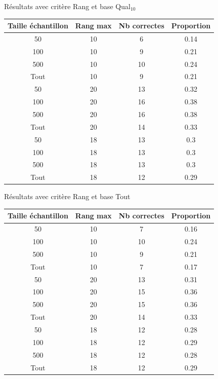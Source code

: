 \documentclass{beamer}
\begin{document}
\begin{frame}{Résultats avec critère Rang et base Qual$_{10}$}

\begin{tabular}{|c|c|c|c|}
   \hline
   Taille échantillon & Rang max & Nb correctes & Proportion\\
   \hline
   50 & 10  & 6 & 0.14  \\
   \hline
   100 & 10  & 9 & 0.21  \\
   \hline
   500 & 10  & 10 & 0.24  \\
   \hline
   Tout & 10 & 9 & 0.21 \\
   \hline
   \hline
   50 & 20  & 13 & 0.32  \\
   \hline
   100 & 20 & 16 & 0.38  \\
   \hline
   500 & 20 & 16 & 0.38  \\
	\hline
	Tout & 20 & 14 & 0.33 \\  
   \hline
   \hline
   50 & 18 & 13 & 0.3  \\
   \hline
   100 & 18 & 13 & 0.3  \\
   \hline
   500 & 18 & 13 & 0.3  \\
   \hline
   Tout & 18 & 12 & 0.29 \\
   \hline
\end{tabular}
\end{frame}

\begin{frame}{Résultats avec critère Rang et base Tout}

\begin{tabular}{|c|c|c|c|}
   \hline
   Taille échantillon & Rang max & Nb correctes & Proportion\\
   \hline
   50 & 10  & 7 & 0.16  \\
   \hline
   100 & 10  & 10 & 0.24  \\
   \hline
   500 & 10  & 9 & 0.21  \\
   \hline
   Tout & 10 & 7 & 0.17  \\
   \hline
   \hline
   50 & 20  & 13 & 0.31  \\
   \hline
   100 & 20 & 15 & 0.36  \\
   \hline
   500 & 20 & 15 & 0.36  \\
   \hline
   Tout & 20 & 14 & 0.33 \\
   \hline
   \hline
   50 & 18 & 12 & 0.28  \\
   \hline
   100 & 18 & 12 & 0.29  \\
   \hline
   500 & 18 & 12 & 0.28  \\
   \hline
   Tout & 18 & 12 & 0.29 \\
   \hline
\end{tabular}
\end{frame}
\end{document}
